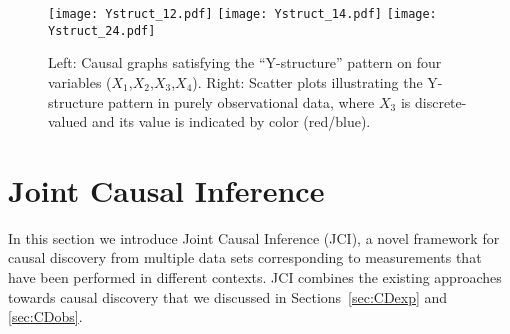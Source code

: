 \documentclass[twoside,11pt]{article}
\begin{document}
\begin{figure}
  \hfill
  \texttt{[image: Ystruct\_12.pdf]}
  \texttt{[image: Ystruct\_14.pdf]}
  \texttt{[image: Ystruct\_24.pdf]}
  \caption{Left: Causal graphs satisfying the ``Y-structure'' pattern on four variables ($X_1$,$X_2$,$X_3$,$X_4$). Right: Scatter plots illustrating the Y-structure pattern in purely observational data, where $X_3$ is discrete-valued and its value is indicated by color (red/blue).\label{fig:Ystruct_data}}
\end{figure}


\section{Joint Causal Inference}\label{sec:JCI}

In this section we introduce Joint Causal Inference (JCI), a novel framework for
causal discovery from multiple data sets corresponding to measurements that
have been performed in different contexts. JCI combines the existing approaches
towards causal discovery that we discussed in Sections~\ref{sec:CDexp} and \ref{sec:CDobs}.
\end{document}
